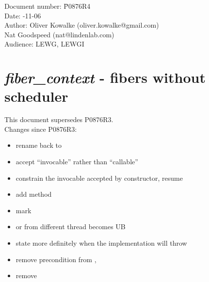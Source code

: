 \documentclass[fontsize=10pt,paper=A4,pagesize,DIV=15]{scrartcl}
\begin{document}
\small
\begin{tabbing}
    Document number: \= P0876R4\\
    Date:            -11-06\\
    Author:          \> Oliver Kowalke (oliver.kowalke@gmail.com)\\
                     \> Nat Goodspeed (nat@lindenlab.com)\\
    Audience:        \> LEWG, LEWGI\\
\end{tabbing}

\section*{\emph{fiber\_context} - fibers without scheduler}


\tableofcontents


This document supersedes P0876R3.\\
\newline
Changes since P0876R3:

\begin{itemize}
    \item rename  back to 
    \item accept ``invocable'' rather than ``callable''
    \item constrain the invocable accepted by constructor, resume
    \item add  method
    \item mark \unwindfib\xspace\cpp{[[noreturn]]}
    \item \resume or \resumewith from different thread becomes UB
    \item state more definitely when the implementation will throw
    \item remove precondition from \canresume, \canxtresume
    \item remove 
\end{itemize}
























\end{document}
